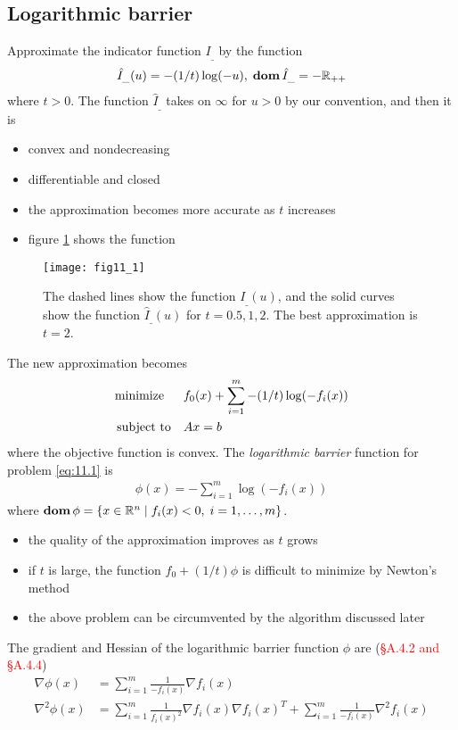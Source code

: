 \subsection{Logarithmic barrier}
Approximate the indicator function $I_\_$ by the function
\begin{align*}
  \hat{I}_\_(u)=-(1/t)\log(-u),\;\mathop{\bf dom}\hat{I}_\_=-\mathbb{R}_{++}
\end{align*}
where $t>0$.
The function $\hat{I}_\_$ takes on $\infty$ for $u>0$ by our convention, and then it is
\begin{itemize}
  \item convex and nondecreasing
  \item differentiable and closed
  \item the approximation becomes more accurate as $t$ increases
  \item figure \ref{fig:11.1} shows the function
\end{itemize}
\begin{figure}
  \centering
  \texttt{[image: fig11\_1]}
  \caption{The dashed lines show the function $I_\_(u)$, and the solid curves show the function $\hat{I}_\_(u)$ for $t=0.5,1,2$. The best approximation is $t=2$.}
  \label{fig:11.1}
\end{figure}
The new approximation becomes
\begin{align}
  \text{minimize\;\;}\quad& f_0(x)+\sum_{i=1}^m-(1/t)\log(-f_i(x))\label{eq:11.4}\\
  \text{subject to}  \quad& Ax=b\nonumber
\end{align}
where the objective function is convex. The \textit{logarithmic barrier} function for problem \eqref{eq:11.1} is
\begin{align}
  \phi(x)=-\sum_{i=1}^m\log(-f_i(x))\label{eq:11.5}
\end{align}
where $\mathop{\bf dom}\phi=\{x\in\mathbb{R}^n\mid f_i(x)<0,\;i=1,\dots,m\}$.
\begin{itemize}
  \item the quality of the approximation improves as $t$ grows
  \item if $t$ is large, the function $f_0+(1/t)\phi$ is difficult to minimize by Newton's method
  \item the above problem can be circumvented by the algorithm discussed later
\end{itemize}
The gradient and Hessian of the logarithmic barrier function $\phi$ are (\textcolor{red}{\S A.4.2 and \S A.4.4})
\begin{align*}
  \nabla\phi(x)  &= \sum_{i=1}^m\frac{1}{-f_i(x)}\nabla f_i(x)\\
  \nabla^2\phi(x)&= \sum_{i=1}^m\frac{1}{f_i(x)^2}\nabla f_i(x)\nabla f_i(x)^T+\sum_{i=1}^m\frac{1}{-f_i(x)}\nabla^2f_i(x)
\end{align*}

